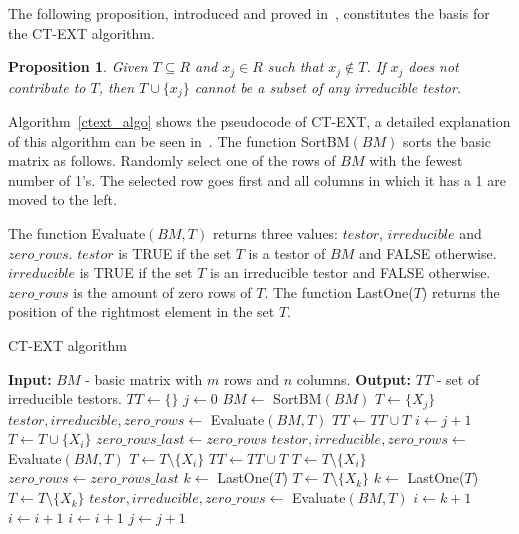 \documentclass[authoryear,preprint,review,12pt]{elsarticle}
\newtheorem{proposition}{Proposition}
\begin{document}
The following proposition, introduced and proved in~\citep{R22}, constitutes the basis for the CT-EXT algorithm.

\begin{proposition}\label{prop1} Given $T \subseteq R$ and $x_j \in R$ such that $x_j \notin T$. If $x_j$ does not contribute to $T$, then $T\cup\{x_j\}$ cannot be a subset of any irreducible testor.
\end{proposition}

Algorithm~\ref{ctext_algo} shows the pseudocode of CT-EXT, a detailed explanation of
this algorithm can be seen in~\citep{R22}. The function SortBM$(BM)$ sorts the basic matrix as follows.
Randomly select one of the rows of $BM$ with the fewest number of 1's. The selected row goes first and
all columns in which it has a 1 are moved to the left.

The function Evaluate$(BM,T)$ returns three values: $testor$, $irreducible$ and $zero\_rows$. $testor$ is TRUE if the set $T$ is a testor of $BM$ and FALSE otherwise. $irreducible$ is TRUE if the set $T$ is an irreducible testor and FALSE otherwise. $zero\_rows$ is the amount of zero rows of $T$. The function LastOne($T$) returns the
position of the rightmost element in the set $T$.

\begin{algorithm}
\begin{spacing}{1.0}
\begin{small}
\caption{CT-EXT algorithm}\label{ctext_algo}
\begin{algorithmic}[1]
\State \textbf{Input: } $BM$ - basic matrix with $m$ rows and $n$ columns.
\State \textbf{Output: } $TT$ - set of irreducible testors.
\State $TT \gets \{\}$
\State $j \gets 0$ 
\State $BM \gets$ SortBM$(BM)$
\label{row1condition}
\State $T \gets \{X_j\}$ 
\State $testor, irreducible, zero\_rows \gets$ Evaluate$(BM,T)$
 
\State $TT \gets TT \cup T$
\EndIf
\Else
\State $i \gets j+1$
\State $T \gets T \cup \{X_i\}$
\State $zero\_rows\_last \gets zero\_rows$
\State $testor, irreducible, zero\_rows \gets$ Evaluate$(BM,T)$
\State $T \gets T \setminus \{X_i\}$ 
\Else
{}
\State $TT \gets TT \cup T$
\EndIf
\State $T \gets T \setminus \{X_i\}$
\State $zero\_rows \gets zero\_rows\_last$
\EndIf
\EndIf
{}
\State $k \gets$ LastOne($T$)
\State $T \gets T \setminus \{X_k\}$
\State $k \gets$ LastOne($T$)
\EndIf
{}
\State $T \gets T \setminus \{X_k\}$
\State $testor, irreducible, zero\_rows \gets$ Evaluate$(BM,T)$
\State $i \gets k+1$
\Else
\State $i \gets i+1$
\EndIf
\Else
\State $i \gets i+1$
\EndIf
\EndWhile
\EndIf
\State $j \gets j+1$
\EndWhile
\end{algorithmic}
\end{small}
\end{spacing}
\end{algorithm}
\end{document}
